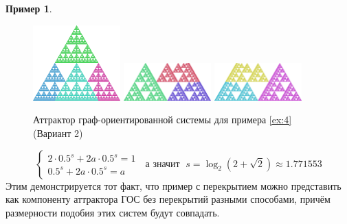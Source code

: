 \documentclass[a4paper,14pt]{extarticle} %
\newcommand{\0}{\varnothing}
\newcommand{\8}{\infty}
\theoremstyle{definition}
\newtheorem{example}{Пример}
\begin{document}
\begin{example}
\begin{figure}[H]
    \centering
    \includegraphics[width=0.3\textwidth]{e4x.png}
    \hfill
    \includegraphics[width=0.3\textwidth]{e4y.png}
    \hfill
    \includegraphics[width=0.3\textwidth]{e4z.png}
    \begin{minipage}{0.85\textwidth}
        \caption{Аттрактор граф-ориентированной системы для примера \ref{ex:4} (Вариант 2)}
        \label{fig:ex4gds2}   
    \end{minipage}
\end{figure}

$$
\begin{cases}
   2\cdot0.5^s + 2a\cdot0.5^s = 1\\
   0.5^s + 2a\cdot0.5^s= a
\end{cases}
\;\text{ а значит }\;s=\log_{2}(2+\sqrt2)\approx1.771553
$$
Этим демонстрируется тот факт, что пример с перекрытием можно представить как компоненту аттрактора ГОС без перекрытий разными способами, причём размерности подобия этих систем будут совпадать.
\end{example}
\end{document}
